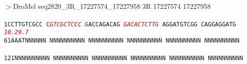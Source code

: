 \documentclass[11pt,twoside,reqno,a4paper]{article}
\begin{document}
\\
$>$DroMel	seq2820\_3R\_17227574\_17227958	3R	17227574	17227958 \\
 \\
\texttt{1\hspace*{3\charwidth}CCTTGTCGCC	C\textit{\textcolor{red}{G}}\textit{\textcolor{red}{T}}\textit{\textcolor{red}{C}}\textit{\textcolor{red}{G}}\textit{\textcolor{red}{C}}\textit{\textcolor{red}{T}}\textit{\textcolor{red}{C}}\textit{\textcolor{red}{C}}\textit{\textcolor{red}{C}}	\textit{\textcolor{red}{G}}ACCAGACAG	\textit{\textcolor{red}{G}}\textit{\textcolor{red}{A}}\textit{\textcolor{red}{C}}\textit{\textcolor{red}{A}}\textit{\textcolor{red}{C}}\textit{\textcolor{red}{T}}\textit{\textcolor{red}{C}}\textit{\textcolor{red}{T}}\textit{\textcolor{red}{T}}\textit{\textcolor{red}{G}}	AGGATGTCGG	CAGGAGGATG	\\
\hspace*{4\charwidth}\hspace*{1\charwidth}\hspace*{11\charwidth}\textit{\textcolor{red}{10.2}}\hspace*{1\charwidth}\hspace*{1\charwidth}\hspace*{15\charwidth}\textit{\textcolor{red}{9.7}}\hspace*{1\charwidth}\hspace*{1\charwidth}\hspace*{1\charwidth}\\
61\hspace*{2\charwidth}AAATNNNNNN	NNNNNNNNNN	NNNNNNNNNN	NNNNNNNNNN	NNNNNNNNNN	NNNNNNNNNN	\\
\hspace*{4\charwidth}\hspace*{1\charwidth}\hspace*{1\charwidth}\hspace*{1\charwidth}\hspace*{1\charwidth}\hspace*{1\charwidth}\hspace*{1\charwidth}\\
121\hspace*{1\charwidth}NNNNNNNNNN	NNNNNNNNNN	NNNNNNNNNN	NNNNNNNNNN	NNNNNNNNNN	NNNNNNNNNN	\\
\hspace*{4\charwidth}\hspace*{1\charwidth}\hspace*{1\charwidth}\hspace*{1\charwidth}\hspace*{1\charwidth}\hspace*{1\charwidth}\hspace*{1\charwidth}\\
}
\end{document}
